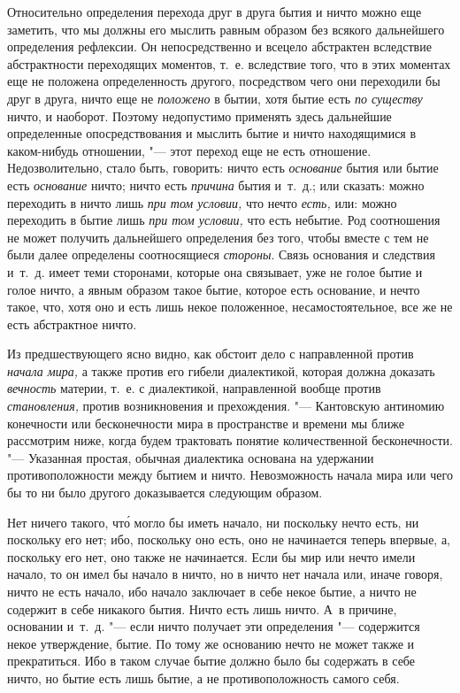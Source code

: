 Относительно определения перехода друг в друга бытия и ничто можно еще
заметить, что мы должны его мыслить равным образом без всякого дальнейшего
определения рефлексии. Он непосредственно и всецело абстрактен вследствие
абстрактности переходящих моментов, т.~е. вследствие того, что в этих моментах
еще не положена определенность другого, посредством чего они переходили бы друг
в друга, ничто еще не {\em положено} в бытии, хотя бытие есть {\em по существу}
ничто, и наоборот. Поэтому недопустимо применять здесь дальнейшие определенные
опосредствования и мыслить бытие и ничто находящимися в каком-нибудь отношении,
"--- этот переход еще не есть отношение. Недозволительно, стало быть, говорить:
ничто есть {\em основание} бытия или бытие есть {\em основание} ничто; ничто
есть {\em причина} бытия и~т.~д.; или сказать: можно переходить в ничто лишь
{\em при том условии,} что нечто {\em есть,} или: можно переходить в бытие лишь
{\em при том условии,} что есть небытие. Род соотношения не может получить
дальнейшего определения без того, чтобы вместе с тем не были далее определены
соотносящиеся {\em стороны}. Связь основания и следствия и~т.~д. имеет теми
сторонами, которые она связывает, уже не голое бытие и голое ничто, а явным
образом такое бытие, которое есть основание, и нечто такое, что, хотя оно и
есть лишь некое положенное, несамостоятельное, все же не есть
абстрактное ничто.


Из предшествующего ясно видно, как обстоит дело с направленной против
{\em начала мира,} а также против его гибели диалектикой, которая должна
доказать {\em вечность} материи, т.~е. с диалектикой, направленной вообще
против {\em становления,} против возникновения и прехождения. "--- Кантовскую
антиномию конечности или бесконечности мира в пространстве и времени мы ближе
рассмотрим ниже, когда будем трактовать понятие количественной бесконечности.
"--- Указанная простая, обычная диалектика основана на удержании
противоположности между бытием и ничто. Невозможность начала мира или чего бы
то ни было другого доказывается следующим образом.

Нет ничего такого, чт\'{о} могло бы иметь начало, ни поскольку нечто есть, ни
поскольку его нет; ибо, поскольку оно есть, оно не начинается теперь впервые,
а, поскольку его нет, оно также не начинается. Если бы мир или нечто имели
начало, то он имел бы начало в ничто, но в ничто нет начала или, иначе говоря,
ничто не есть начало, ибо начало заключает в себе некое бытие, а ничто не
содержит в себе никакого бытия. Ничто есть лишь ничто. А~в причине, основании
и~т.~д. "--- если ничто получает эти определения "--- содержится некое
утверждение, бытие. По тому же основанию нечто не может также и прекратиться.
Ибо в таком случае бытие должно было бы содержать в себе ничто, но бытие есть
лишь бытие, а не противоположность самого себя.

